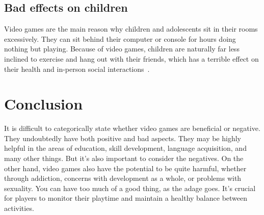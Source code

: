 \documentclass[10pt,twoside,english,a4paper]{article}
\begin{document}
\subsection{Bad effects on children}
Video games are the main reason why children and adolescents sit in their rooms excessively. They can sit behind their computer or console for hours doing nothing but playing. Because of video games, children are naturally far less inclined to exercise and hang out with their friends, which has a terrible effect on their health and in-person social interactions~\cite{problems}.

\section{Conclusion} \label{conclusion}
It is difficult to categorically state whether video games are beneficial or negative. They undoubtedly have both positive and bad aspects. They may be highly helpful in the areas of education, skill development, language acquisition, and many other things. But it's also important to consider the negatives. On the other hand, video games also have the potential to be quite harmful, whether through addiction, concerns with development as a whole, or problems with sexuality. You can have too much of a good thing, as the adage goes. It's crucial for players to monitor their playtime and maintain a healthy balance between activities.




\end{document}
